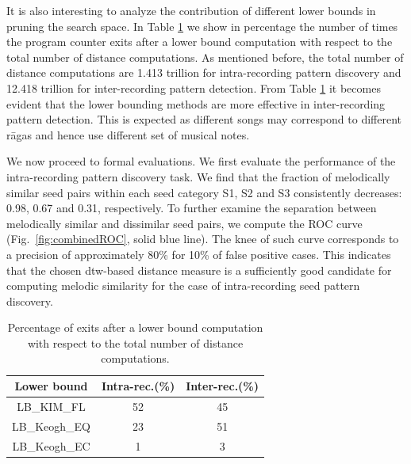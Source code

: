 It is also interesting to analyze the contribution of different lower bounds in pruning the search space. In Table \ref{tab:computationalStats} we show in percentage the number of times the program counter exits after a lower bound computation with respect to the total number of distance computations. As mentioned before, the total number of distance computations are 1.413 trillion for intra-recording pattern discovery and 12.418 trillion for inter-recording pattern detection. From Table \ref{tab:computationalStats} it becomes evident that the lower bounding methods are more effective in inter-recording pattern detection. This is expected as different songs may correspond to different r\={a}gas and hence use different set of musical notes.


We now proceed to formal evaluations. We first evaluate the performance of the intra-recording pattern discovery task. We find that the fraction of melodically similar seed pairs within each seed category S1, S2 and S3 consistently decreases: 0.98, 0.67 and 0.31, respectively. To further examine the separation between melodically similar and dissimilar seed pairs, we compute the ROC curve (Fig.~\ref{fig:combinedROC}, solid blue line). The knee of such curve corresponds to a precision of approximately 80\% for 10\% of false positive cases. This indicates that the chosen \gls{dtw}-based distance measure is a sufficiently good candidate for computing melodic similarity for the case of intra-recording seed pattern discovery. 

\begin{table} 
	\centering
	\caption{Percentage of exits after a lower bound computation with respect to the total number of distance computations.}
	\label{tab:computationalStats}
	
	\begin{tabular}{ c | c c }
		
		\hline\hline
		Lower bound   	& Intra-rec.(\%)		&	Inter-rec.(\%) \\	
		
		\hline 
		LB\_KIM\_FL   	& 52	&	45 \\	
		LB\_Keogh\_EQ   	& 23	&	51 \\
		LB\_Keogh\_EC   		& 1	&	3 \\
		\hline\hline
		
	\end{tabular}
	
\end{table}



